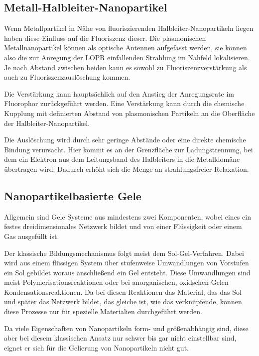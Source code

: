     \subsection{Metall-Halbleiter-Nanopartikel}
    Wenn Metallpartikel in Nähe von fluoriszierenden Halbleiter-Nanopartikeln liegen haben diese Einfluss auf die Fluoriszenz dieser.
    Die plasmonischen Metallnanopartikel können als optische Antennen aufgefasst werden, sie können also die zur Anregung der LOPR einfallenden Strahlung im Nahfeld lokalisieren. 
    Je nach Abstand zwischen beiden kann es sowohl zu Fluoriszenzverstärkung als auch zu Fluoriszenzauslöschung kommen. \autocite{Kulakovich2002,Viste2010}
    
    Die Verstärkung kann hauptsächlich auf den Anstieg der Anregungsrate im Fluorophor zurückgeführt werden.\autocite{Chen2008}
    Eine Verstärkung kann durch die chemische Kupplung mit definierten Abstand von plasmonischen Partikeln an die Oberfläche der Halbleiter-Nanopartikel.\autocite{Lee2004}
    
    Die Auslöschung wird durch sehr geringe Abstände oder eine direkte chemische Bindung verursacht.\autocite{Costi2010}
    Hier kommt es an der Grenzfläche zur Ladungstrennung, bei dem ein Elektron aus dem Leitungsband des Halbleiters in die Metalldomäne übertragen wird.
    Dadurch erhöht sich die Menge an strahlungsfreier Relaxation.
    
    
    \subsection{Nanopartikelbasierte Gele}
    
    Allgemein sind Gele Systeme aus mindestens zwei Komponenten, wobei eines ein festes dreidimensionales Netzwerk bildet und von einer Flüssigkeit oder einem Gas ausgefüllt ist. \autocite{Aleman2007}
    
    Der klassische Bildungsmechanismus folgt meist dem Sol-Gel-Verfahren. \autocite{Ziegler2017}
    Dabei wird aus einem flüssigen System über stufenweise Umwandlungen von Vorstufen ein Sol gebildet woraus anschließend ein Gel entsteht. \autocite{Aleman2007}
    Diese Umwandlungen sind meist Polymerisationsreaktionen oder bei anorganischen, oxidschen Gelen Kondensationsreaktionen. 
    Da bei diesen Reaktionen das Material, das das Sol und später das Netzwerk bildet, das gleiche ist, wie das verknüpfende, können diese Prozesse nur für spezielle Materialien durchgeführt werden.
    
    Da viele Eigenschaften von Nanopartikeln form- und größenabhängig sind, diese aber bei diesem klassischen Ansatz nur schwer bis gar nicht einstellbar sind, eignet er sich für die Gelierung von Nanopartikeln nicht gut.
    
